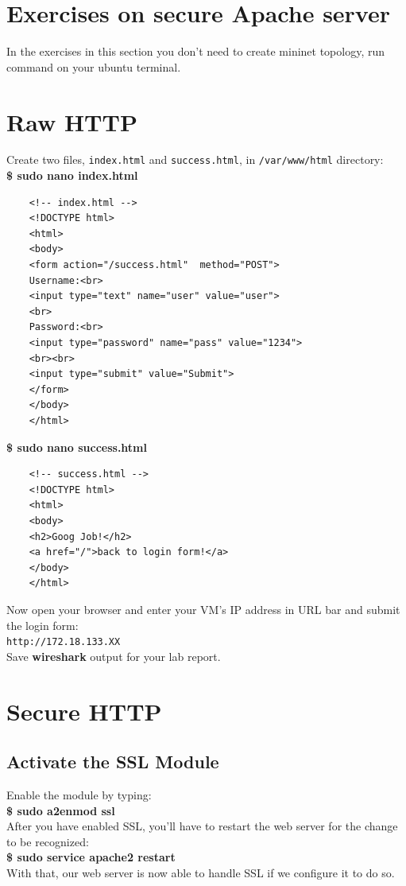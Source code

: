 \documentclass[10pt,a4paper]{article}
\numberwithin{equation}{section}
\numberwithin{figure}{section}
\numberwithin{table}{section}
\begin{document}
	\section*{Exercises on secure Apache server}
	In the exercises in this section you don't need to create mininet topology, run command on your ubuntu terminal.
	\section{Raw HTTP}
	Create two files, \texttt{index.html} and \texttt{success.html}, in \texttt{/var/www/html} directory: \\
	\textbf{\$ sudo nano index.html}
	\begin{verbatim}
	<!-- index.html --> 
	<!DOCTYPE html>
	<html>
	<body>
	<form action="/success.html"  method="POST">
	Username:<br>
	<input type="text" name="user" value="user">
	<br>
	Password:<br>
	<input type="password" name="pass" value="1234">
	<br><br>
	<input type="submit" value="Submit">
	</form>
	</body>
	</html>
	\end{verbatim}
	\textbf{\$ sudo nano success.html}
	\begin{verbatim}
	<!-- success.html --> 
	<!DOCTYPE html>
	<html>
	<body>
	<h2>Goog Job!</h2>
	<a href="/">back to login form!</a>
	</body>
	</html>
	\end{verbatim}
	
	Now open your browser and enter your VM's IP address in URL bar and submit the login form:\\
	\texttt{http://172.18.133.XX} \\
	Save \textbf{wireshark} output for your lab report.
	\section{Secure HTTP}
	\subsection{Activate the SSL Module}
	Enable the module by typing: \\
	\textbf{\$ sudo a2enmod ssl} \\
	After you have enabled SSL, you'll have to restart the web server for the change to be recognized: \\
	\textbf{\$ sudo service apache2 restart} \\
	With that, our web server is now able to handle SSL if we configure it to do so. \\
\end{document}

